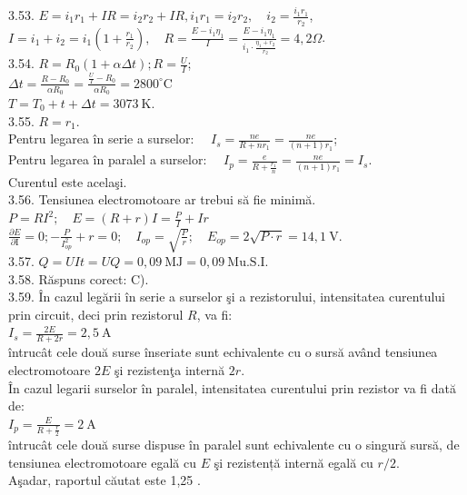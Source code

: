 3.53. $E=i_{1} r_{1}+I R=i_{2} r_{2}+I R, i_{1} r_{1}=i_{2} r_{2}, \quad i_{2}=\frac{i_{1} r_{1}}{r_{2}}$,\\ $I=i_{1}+i_{2}=i_{1}\left(1+\frac{r_{1}}{r_{2}}\right), \quad R=\frac{E-i_{1} \eta_{1}}{I}=\frac{E-i_{1} \eta_{1}}{i_{1} \cdot \frac{\eta_{1}+r_{2}}{r_{2}}}=4,2 \Omega$.\\

3.54. $R=R_{0}(1+\alpha \Delta t) ; R=\frac{U}{I}$;\\ $\Delta t=\frac{R-R_{0}}{\alpha R_{0}}=\frac{\frac{U}{I}-R_{0}}{\alpha R_{0}}=2800^{\circ} \mathrm{C}$\\ $T=T_{0}+t+\Delta t=3073 \mathrm{~K}$.\\

3.55. $R=r_{1}$.\\ Pentru legarea în serie a surselor: $\quad I_{s}=\frac{n e}{R+n r_{1}}=\frac{n e}{(n+1) r_{1}}$;\\ Pentru legarea în paralel a surselor: $\quad I_{p}=\frac{e}{R+\frac{r_{1}}{n}}=\frac{n e}{(n+1) r_{1}}=I_{s}$.\\ Curentul este acelaşi.\\

3.56. Tensiunea electromotoare ar trebui să fie minimă.\\ $P=R I^{2} ; \quad E=(R+r) I=\frac{P}{I}+I r$\\ $\frac{\partial E}{\partial \mathrm{I}}=0 ;-\frac{P}{I_{o p}^{2}}+r=0 ; \quad I_{o p}=\sqrt{\frac{P}{r}} ; \quad E_{o p}=2 \sqrt{P \cdot r}=14,1 \mathrm{~V}$.\\

3.57. $Q=U I t=U Q=0,09 \mathrm{~MJ}=0,09 \mathrm{~Mu.S.I}$.\\

3.58. Răspuns corect: C).\\

3.59. În cazul legării în serie a surselor şi a rezistorului, intensitatea curentului prin circuit, deci prin rezistorul $R$, va fi:\\ $I_{s}=\frac{2 E}{R+2 r}=2,5 \mathrm{~A}$\\ întrucât cele două surse înseriate sunt echivalente cu o sursă având tensiunea electromotoare $2 E$ şi rezistenţa internă $2 r$.\\ În cazul legarii surselor în paralel, intensitatea curentului prin rezistor va fi dată de:\\ $I_{p}=\frac{E}{R+\frac{r}{2}}=2 \mathrm{~A}$\\ întrucât cele două surse dispuse în paralel sunt echivalente cu o singură sursă, de tensiunea electromotoare egală cu $E$ şi rezistență internă egală cu $r / 2$.\\ Aşadar, raportul căutat este 1,25 .\\

